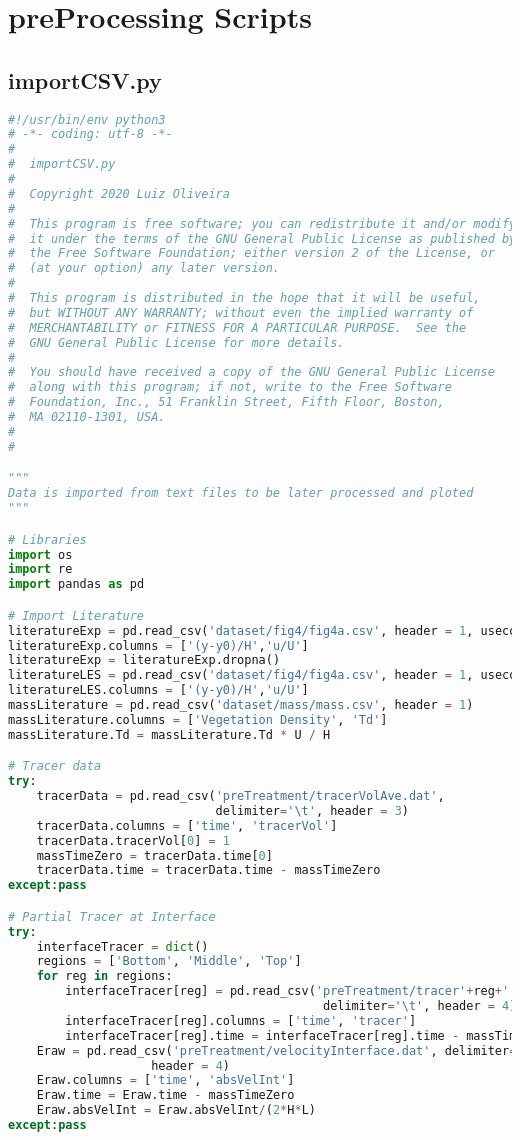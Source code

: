 \section{preProcessing Scripts}
\subsection{importCSV.py}
\begin{lstlisting}[language=python]
#!/usr/bin/env python3
# -*- coding: utf-8 -*-
#
#  importCSV.py
#  
#  Copyright 2020 Luiz Oliveira
#  
#  This program is free software; you can redistribute it and/or modify
#  it under the terms of the GNU General Public License as published by
#  the Free Software Foundation; either version 2 of the License, or
#  (at your option) any later version.
#  
#  This program is distributed in the hope that it will be useful,
#  but WITHOUT ANY WARRANTY; without even the implied warranty of
#  MERCHANTABILITY or FITNESS FOR A PARTICULAR PURPOSE.  See the
#  GNU General Public License for more details.
#  
#  You should have received a copy of the GNU General Public License
#  along with this program; if not, write to the Free Software
#  Foundation, Inc., 51 Franklin Street, Fifth Floor, Boston,
#  MA 02110-1301, USA.
#  
#  

"""
Data is imported from text files to be later processed and ploted
"""

# Libraries
import os
import re
import pandas as pd

# Import Literature
literatureExp = pd.read_csv('dataset/fig4/fig4a.csv', header = 1, usecols=(0,1))
literatureExp.columns = ['(y-y0)/H','u/U']
literatureExp = literatureExp.dropna()
literatureLES = pd.read_csv('dataset/fig4/fig4a.csv', header = 1, usecols=(2,3))
literatureLES.columns = ['(y-y0)/H','u/U']
massLiterature = pd.read_csv('dataset/mass/mass.csv', header = 1)
massLiterature.columns = ['Vegetation Density', 'Td']
massLiterature.Td = massLiterature.Td * U / H

# Tracer data
try:
    tracerData = pd.read_csv('preTreatment/tracerVolAve.dat',
                             delimiter='\t', header = 3)
    tracerData.columns = ['time', 'tracerVol']
    tracerData.tracerVol[0] = 1
    massTimeZero = tracerData.time[0]
    tracerData.time = tracerData.time - massTimeZero
except:pass

# Partial Tracer at Interface
try:
    interfaceTracer = dict()
    regions = ['Bottom', 'Middle', 'Top']
    for reg in regions:
        interfaceTracer[reg] = pd.read_csv('preTreatment/tracer'+reg+'.dat',\
                                            delimiter='\t', header = 4)
        interfaceTracer[reg].columns = ['time', 'tracer']
        interfaceTracer[reg].time = interfaceTracer[reg].time - massTimeZero
    Eraw = pd.read_csv('preTreatment/velocityInterface.dat', delimiter='\t',\
                    header = 4)
    Eraw.columns = ['time', 'absVelInt']
    Eraw.time = Eraw.time - massTimeZero
    Eraw.absVelInt = Eraw.absVelInt/(2*H*L)
except:pass


\end{lstlisting}
